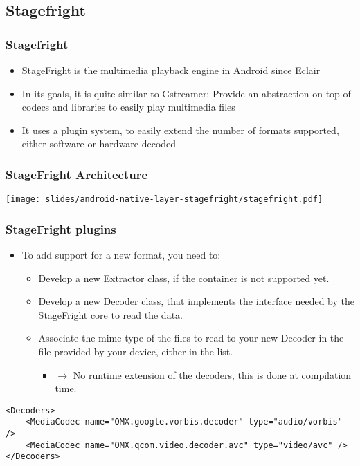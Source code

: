 \subsection{Stagefright}
\begin{frame}
  \frametitle{Stagefright}
  \begin{itemize}
  \item StageFright is the multimedia playback engine in Android since
    Eclair
  \item In its goals, it is quite similar to Gstreamer: Provide an
    abstraction on top of codecs and libraries to easily play
    multimedia files
  \item It uses a plugin system, to easily extend the number of
    formats supported, either software or hardware decoded
  \end{itemize}
\end{frame}

\begin{frame}
  \frametitle{StageFright Architecture}
  \begin{center}
    \texttt{[image: slides/android-native-layer-stagefright/stagefright.pdf]}
  \end{center}
\end{frame}

\begin{frame}[fragile]
  \frametitle{StageFright plugins}
  \begin{itemize}
  \item To add support for a new format, you need to:
    \begin{itemize}
    \item Develop a new Extractor class, if the container is not
      supported yet.
    \item Develop a new Decoder class, that implements the interface
      needed by the StageFright core to read the data.
    \item Associate the mime-type of the files to read to your new
      Decoder in the  file provided by
      your device, either in the  list.
      \begin{itemize}
      \item $\rightarrow$ No runtime extension of the decoders, this
        is done at compilation time.
      \end{itemize}
    \end{itemize}
  \end{itemize}
\begin{verbatim}
<Decoders>
    <MediaCodec name="OMX.google.vorbis.decoder" type="audio/vorbis" />
    <MediaCodec name="OMX.qcom.video.decoder.avc" type="video/avc" />
</Decoders>
\end{verbatim}
\end{frame}

